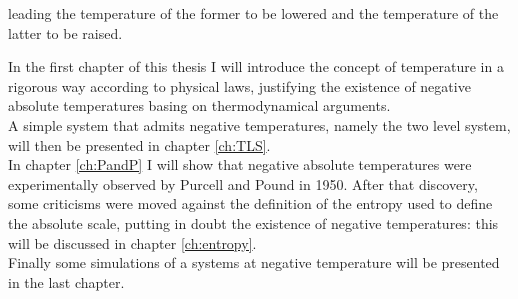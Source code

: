 leading the temperature of the former to be lowered and the temperature of the latter to be raised. \par
\vspace{10pt}
In the first chapter of this thesis I will introduce the concept of temperature in a rigorous way according to physical laws, justifying the existence of negative absolute temperatures basing on thermodynamical arguments. \\
A simple system that admits negative temperatures, namely the two level system, will then be presented in chapter \ref{ch:TLS}. \\
In chapter \ref{ch:PandP} I will show that negative absolute temperatures were experimentally observed by Purcell and Pound in 1950. 
After that discovery, some criticisms were moved against the definition of the entropy used to define the absolute scale, putting in doubt the existence of negative temperatures: this will be discussed in chapter \ref{ch:entropy}. \\
Finally some simulations of a systems at negative temperature will be presented in the last chapter.